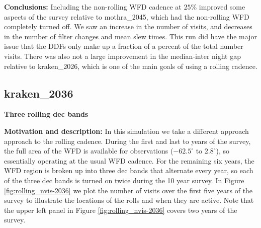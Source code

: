 \documentclass[DM,lsstdraft,authoryear,toc]{lsstdoc}
\begin{document}
\textbf{Conclusions:} Including the non-rolling WFD cadence at $25\%$ improved some aspects of the survey 
relative to mothra\_2045, which had the non-rolling WFD completely turned off. We saw an increase in the number of visits,
and decreases in the number of filter changes and mean slew times. This run did have the major issue that the DDFs only
make up a fraction of a percent of the total number visits. There was also not a large improvement in the median-inter night
gap relative to kraken\_2026, which is one of the main goals of using a rolling cadence.

\subsection{kraken\_2036} \label{kraken2036}

\textbf{Three rolling dec bands}

\textbf{Motivation and description:} In this simulation we take a different approach approach to the rolling cadence. During
the first and last to years of the survey, the full area of the WFD is available for observations ($-62.5^{\circ}$ to $2.8^{\circ}$), so essentially
operating at the usual WFD cadence. For the remaining six years, the WFD region is broken up into three dec bands that alternate every year,
so each of the three dec bands is turned on twice during the 10 year survey. In Figure \autoref{fig:rolling_nvis-2036}
we plot the number of visits over the first five years of the survey to illustrate the locations of the rolls and when they are active. Note that
the upper left panel in Figure \autoref{fig:rolling_nvis-2036} covers two years of the survey.
\end{document}
